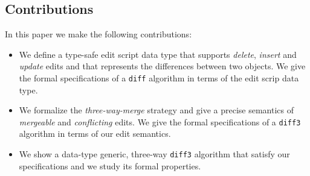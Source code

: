 \documentclass[preprint]{sigplanconf}
\begin{document}

\subsection{Contributions}
In this paper we make the following contributions:
\begin{itemize}
\item We define a type-safe edit script data type that supports \emph{delete},
      \emph{insert} and \emph{update} edits and that represents the differences
      between two objects. We give the formal specifications of a \texttt{diff} 
      algorithm in terms of the edit scrip data type.
\item We formalize the \emph{three-way-merge} strategy and give a precise semantics 
      of \emph{mergeable} and \emph{conflicting} edits. We give the formal   
      specifications of a \texttt{diff3} algorithm in terms of our edit semantics. 
\item We show a data-type generic, three-way \texttt{diff3} algorithm that satisfy
      our specifications and we study its formal properties.
\end{itemize}
\end{document}
